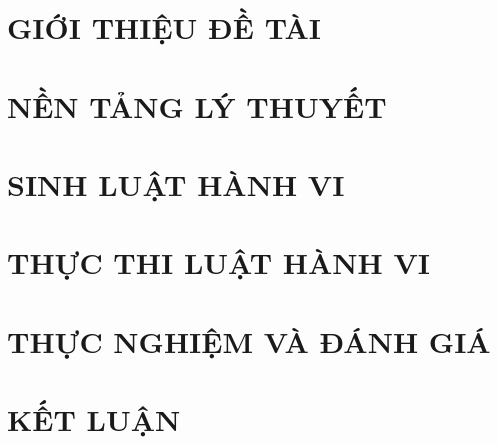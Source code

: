 \documentclass[a4paper,13pt,3p,twoside]{report}
\renewcommand{\_}{\gachduoi\allowbreak}
\theoremstyle{definition}
\begin{document}
\newpage


\renewcommand\appendixname{PHỤ LỤC}
\renewcommand\appendixpagename{PHỤ LỤC}
\renewcommand\appendixtocname{PHỤ LỤC}



\newpage
{}

\pagestyle{fancy}
\fancyhf{}
\fancyhead[RE, LO]{\small\leftmark} %
\fancyfoot[RE, LO]{\thepage}

\chapter{GIỚI THIỆU ĐỀ TÀI}
\label{chapter:Introduction}


\newpage
\chapter{NỀN TẢNG LÝ THUYẾT}
\label{chapter:Related_works}


\newpage
\chapter{SINH LUẬT HÀNH VI}
\label{chapter:RuleGeneration}


\newpage
\chapter{THỰC THI LUẬT HÀNH VI}
\label{chapter:RuleExecution}


\newpage
\chapter{THỰC NGHIỆM VÀ ĐÁNH GIÁ}
\label{chapter:Experiment}


\newpage
\chapter{KẾT LUẬN}
\label{chapter:conclusion}

\end{document}
